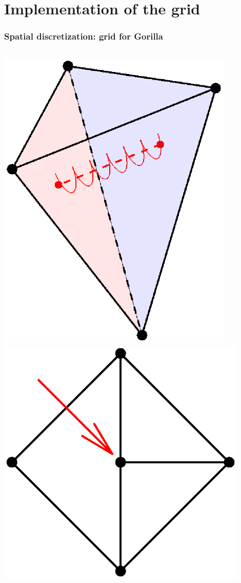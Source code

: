 \documentclass{beamer}
\begin{document}
\section{Implementation of the grid}

\begin{frame}
\frametitle{Spatial discretization: grid for \textbf{Gorilla}}
\vspace{-1cm}
\begin{columns}[onlytextwidth]
	\begin{column}{0.37\textwidth}
		\begin{center}
			\vspace{-0.5cm}
			\includegraphics[trim={5cm 1cm 0cm 0cm},clip,width=0.85\textwidth,right]{FIGURES/tetrahedron_guiding_center.eps}
			\includegraphics[trim={4 1.6 1 0.6cm},clip,width=0.9\textwidth,right]{FIGURES/HangingNode.eps}

\end{center}
\end{column}
\end{columns}
\end{frame}
\end{document}
